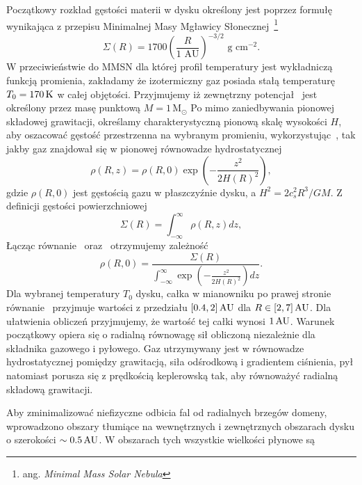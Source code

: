 \par Początkowy rozkład gęstości materii w dysku określony jest poprzez formułę
wynikająca z przepisu Minimalnej Masy Mgławicy Słonecznej~\footnote{ang.
\emph{Minimal Mass Solar Nebula}}~\cite{H81}
\begin{equation}\label{eq:mmsn}
   \Sigma(R) = 1700 \left(\frac{R}{1\textrm{ AU}}\right)^{-3/2} 
   \textrm{ g cm}^{-2}.
\end{equation}
W przeciwieństwie do MMSN dla której profil temperatury jest wykładniczą funkcją
promienia, zakładamy że izotermiczny gaz posiada stałą temperaturę $T_0 = 170\hbox{$\thinspace\textrm{K}$}$
w całej objętości. Przyjmujemy iż zewnętrzny potencjał~ jest
określony przez masę punktową $M=1\,\textrm{M}_\odot$
Po mimo zaniedbywania pionowej składowej grawitacji, określamy charakterystyczną
pionową skalę wysokości $H$, aby oszacować gęstość przestrzenna na wybranym
promieniu, wykorzystując~, tak jakby gaz znajdował się w pionowej
równowadze hydrostatycznej
%
\begin{equation}\label{eq:rhoR}
   \rho(R,z) =  \rho(R,0) \exp\left(-\frac{z^2}{2H(R)^2}\right),
\end{equation}
gdzie $\rho(R,0)$ jest gęstością gazu w płaszczyźnie dysku, a $H^2 = 2 c_s^2 R^3/
GM$.
%
Z definicji gęstości powierzchniowej
\begin{equation} \label{eq:sigmaR}
   \Sigma(R) = \int_{-\infty}^\infty \rho(R,z) dz,
\end{equation}
%
Łącząc równanie~ oraz~ otrzymujemy zależność
\begin{equation}
   \label{eq:rho}
    \rho(R,0) = \frac{\Sigma(R) }{\int_{-\infty}^\infty
   \exp\left(-\frac{z^2}{2H(R)^2}\right) dz}.
\end{equation}
Dla wybranej temperatury $T_0$ dysku, całka w mianowniku po prawej stronie
równanie~ przyjmuje wartości z przedziału $[0.4,2]\hbox{$\thinspace\textrm{AU}$}$ dla $R \in
[2,7]\hbox{$\thinspace\textrm{AU}$}$. Dla ułatwienia obliczeń przyjmujemy, że wartość tej całki wynosi $1\hbox{$\thinspace\textrm{AU}$}$.
Warunek początkowy opiera się o radialną równowagę sił obliczoną niezależnie dla
składnika gazowego i pyłowego. Gaz utrzymywany jest w równowadze hydrostatycznej
pomiędzy grawitacją, siła odśrodkową i gradientem ciśnienia, pył natomiast
porusza się z prędkością keplerowską tak, aby równoważyć radialną składową
grawitacji.
\par Aby zminimalizować niefizyczne odbicia fal od radialnych brzegów domeny,
wprowadzono obszary tłumiące na wewnętrznych i zewnętrznych obszarach dysku o
szerokości $\sim0.5\hbox{$\thinspace\textrm{AU}$}$. W obszarach tych wszystkie wielkości płynowe są
